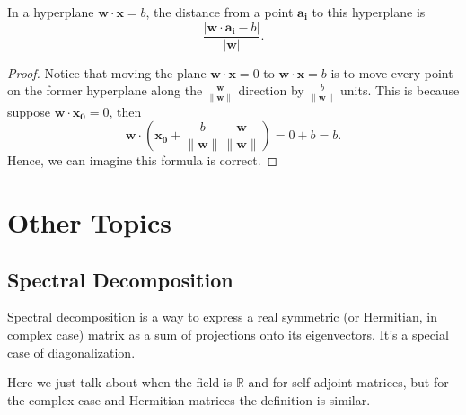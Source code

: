 \begin{corollary}
  In a hyperplane \(\mathbf{w} \cdot \mathbf{x} = b\), the distance from a point \(\mathbf{a_i} \)  to this hyperplane is 
  \[
    \frac{\left\vert \mathbf{w} \cdot \mathbf{a_i} - b  \right\vert }{\left\vert \mathbf{w}  \right\vert }.
  \]
\end{corollary}
\begin{proof}
  Notice that moving the plane \(\mathbf{w} \cdot \mathbf{x} = 0\) to \(\mathbf{w} \cdot \mathbf{x} = b\) is to move every point on the former hyperplane along the \(\frac{\mathbf{w} }{\lVert \mathbf{w}  \rVert }\) direction by \(\frac{b}{\lVert \mathbf{w}  \rVert }\) units. This is because suppose \(\mathbf{w} \cdot \mathbf{x_0} = 0 \), then 
  \[
    \mathbf{w} \cdot \left( \mathbf{x_0} + \frac{b}{\lVert \mathbf{w}  \rVert }\frac{\mathbf{w} }{\lVert \mathbf{w}  \rVert }  \right) = 0 + b = b.
  \]      
  Hence, we can imagine this formula is correct.
\end{proof}


































\chapter{Other Topics}
\section{Spectral Decomposition} \label{appendix: spectral decomposition}

Spectral decomposition is a way to express a real symmetric (or Hermitian, in complex case) matrix as a sum of projections onto its eigenvectors. It's a special case of diagonalization.

Here we just talk about when the field is \(\mathbb{R} \) and for self-adjoint matrices, but for the complex case and Hermitian matrices the definition is similar.


